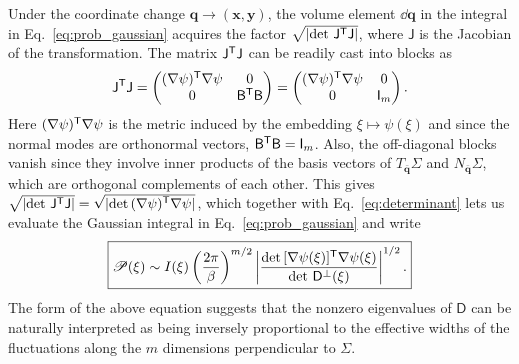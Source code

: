 Under the coordinate change $\bm{q} \to (\bm{x},\bm{y})$, the volume element $\dd{\bm{q}}$ in the integral in Eq.~\eqref{eq:prob_gaussian} acquires the factor $\sqrt{\lvert\det\,\mathsf{J}^\mathsf{T}\mathsf{J}\rvert}$, where $\mathsf{J}$ is the Jacobian of the transformation.
The matrix $\mathsf{J}^\mathsf{T}\mathsf{J}$ can be readily cast into blocks as
%
\begin{equation}
  \mathsf{J}^\mathsf{T}\mathsf{J} =
  \begin{pmatrix}
    (\nabla\psi)^\mathsf{T}\nabla\psi & 0 \\
    0 & \mathsf{B}^\mathsf{T}\mathsf{B}
  \end{pmatrix}
  =
  \begin{pmatrix}
    (\nabla\psi)^\mathsf{T}\nabla\psi & 0 \\
    0 & \mathsf{I}_{m}
  \end{pmatrix}.
\end{equation}
%
Here $(\nabla\psi)^\mathsf{T}\nabla\psi$ is the metric induced by the embedding $\xi \mapsto \psi(\xi)$ and since the normal modes are orthonormal vectors, $\mathsf{B} ^\mathsf{T}\mathsf{B}  = \mathsf{I}_m$.
Also, the off-diagonal blocks vanish since they involve inner products of the basis vectors of $T_{\bar{\bm{q}}}\Sigma$ and $N_{\bar{\bm{q}}}\Sigma$, which are orthogonal complements of each other.
This gives $\sqrt{\lvert\det\,\mathsf{J}^\mathsf{T}\mathsf{J}\rvert} = \sqrt{\smash[b]{\lvert\det\, (\nabla\psi)^\mathsf{T}\nabla\psi\rvert}}$, which together with Eq.~\eqref{eq:determinant} lets us evaluate the Gaussian integral in Eq.~\eqref{eq:prob_gaussian} and write
%
\begin{equation}
  \boxed{\mathscr{P}(\xi) \sim I(\xi)\left(\frac{2\pi}{\beta}\right)^{m/2}
  \left|\frac{\det\,[\nabla\psi(\xi)]^\mathsf{T}\nabla\psi(\xi)}{\det\,\mathsf{D}^{\perp}(\xi)}\right|^{1/2}.}
  \label{eq:mpd_regular}
\end{equation}
The form of the above equation suggests that the nonzero eigenvalues of $\mathsf{D}$ can be naturally interpreted as being inversely proportional to the effective widths of the fluctuations along the $m$ dimensions perpendicular to $\Sigma$.
%
